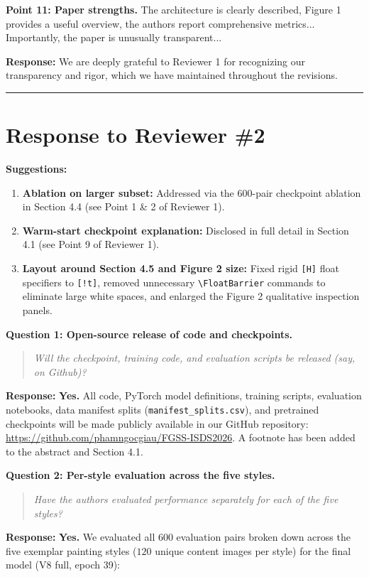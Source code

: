 \documentclass[11pt,a4paper]{article}
\begin{document}
\begin{revcomment}
\textbf{Point 11: Paper strengths.} The architecture is clearly described, Figure 1 provides a useful overview, the authors report comprehensive metrics... Importantly, the paper is unusually transparent...
\end{revcomment}

\noindent \textbf{Response:} We are deeply grateful to Reviewer 1 for recognizing our transparency and rigor, which we have maintained throughout the revisions.

\vspace{1.5em}
\hrule
\vspace{1.5em}

\section*{Response to Reviewer \#2}

\noindent \textbf{Suggestions:}
\begin{enumerate}[leftmargin=*]
\item \textbf{Ablation on larger subset:} Addressed via the 600-pair checkpoint ablation in Section 4.4 (see Point 1 \& 2 of Reviewer 1).
\item \textbf{Warm-start checkpoint explanation:} Disclosed in full detail in Section 4.1 (see Point 9 of Reviewer 1).
\item \textbf{Layout around Section 4.5 and Figure 2 size:} Fixed rigid \texttt{[H]} float specifiers to \texttt{[!t]}, removed unnecessary \texttt{\textbackslash FloatBarrier} commands to eliminate large white spaces, and enlarged the Figure 2 qualitative inspection panels.
\end{enumerate}

\noindent \textbf{Question 1: Open-source release of code and checkpoints.}
\begin{quote}
\textit{Will the checkpoint, training code, and evaluation scripts be released (say, on Github)?}
\end{quote}
\textbf{Response:} \textbf{Yes.} All code, PyTorch model definitions, training scripts, evaluation notebooks, data manifest splits (\texttt{manifest\_splits.csv}), and pretrained checkpoints will be made publicly available in our GitHub repository: \url{https://github.com/phamngocgiau/FGSS-ISDS2026}. A footnote has been added to the abstract and Section 4.1.

\noindent \textbf{Question 2: Per-style evaluation across the five styles.}
\begin{quote}
\textit{Have the authors evaluated performance separately for each of the five styles?}
\end{quote}
\textbf{Response:} \textbf{Yes.} We evaluated all 600 evaluation pairs broken down across the five exemplar painting styles ($120$ unique content images per style) for the final model (V8 full, epoch 39):
\end{document}
